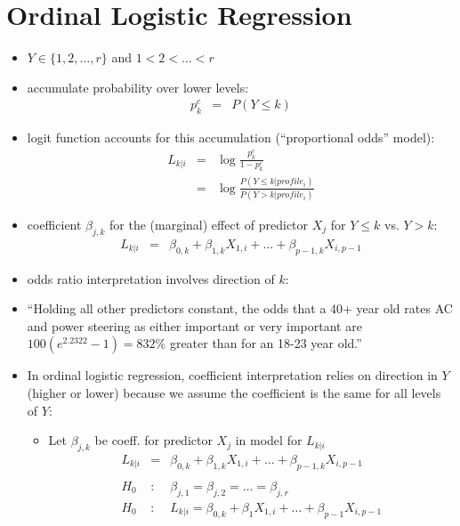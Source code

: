 \documentclass[12pt]{notes}
\begin{document}
\section{Ordinal Logistic Regression}
\begin{itemize}
  \item $Y \in \{1, 2, \ldots, r \}$ and $1 < 2 < \ldots < r$
  \item accumulate probability over lower levels:
    \begin{eqnarray}
      p_k^c & = & P( Y \leq k ) \nonumber
    \end{eqnarray}
  \item  logit function accounts for this accumulation (``proportional odds'' model):
    \begin{eqnarray}
      L_{k|i} & = &  \log \frac{p_k^c}{1 - p_k^c} \nonumber \\
       & = & \log \frac{P(Y \leq k | profile_i)}{ P(Y > k | profile_i)} \nonumber
    \end{eqnarray}
  \item coefficient $\beta_{j,k}$ for the (marginal) effect of predictor $X_j$ for $Y \leq k$ vs. $Y > k$:
      \begin{eqnarray}
        L_{k|i} & = & \beta_{0,k} + \beta_{1,k} X_{1,i} + \ldots + \beta_{p-1,k} X_{i,p-1}
         \nonumber
      \end{eqnarray}
  \item odds ratio interpretation involves direction of $k$:
  \bi
  \item  ``Holding all other predictors constant, the odds that a 40+ year old rates AC and power steering as either important or very important are $100(e^{2.2322} - 1) = 832\%$ greater than for an 18-23 year old.''
  \ei
  \item In ordinal logistic regression, coefficient interpretation relies on direction in $Y$ (higher or lower) because we assume the coefficient is the same for all levels of $Y$:
        \begin{itemize}
          \item Let $\beta_{j,k}$ be coeff. for predictor $X_j$ in model for $L_{k|i}$
                \begin{eqnarray}
                   L_{k|i} & = & \beta_{0,k} + \beta_{1,k} X_{1,i} + \ldots + \beta_{p-1,k} X_{i,p-1} \nonumber \\
                   & & \nonumber \\
                   H_0 & : & \beta_{j,1} = \beta_{j,2} = \ldots = \beta_{j,r} \nonumber \\
                   H_0 & : & L_{k|i}  =  \beta_{0,k} + \beta_{1} X_{1,i} + \ldots + \beta_{p-1} X_{i,p-1} \nonumber
                \end{eqnarray}
        \end{itemize}
\end{itemize}



\end{document}
